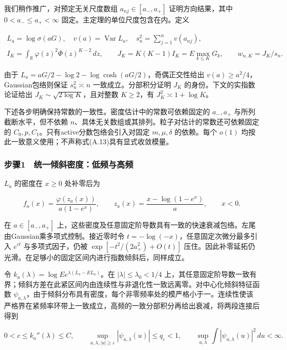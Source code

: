 \documentclass[11pt,a4paper]{article}
\begin{document}
我们稍作推广，对预定无关尺度数组 \(a_{nj}\in[a_-,a_+]\)
证明方向结果，其中 \(0<a_-\le a_+<\infty\)
固定。主定理的单位尺度包含在内。定义

\[
\begin{gathered}
L_a=\log\sigma(aG),\quad v(a)=\operatorname{Var}L_a,\quad
s_n^2=\sum_{j=1}^nv(a_{nj}),\\
I_K=\int_{\mathbb R}\varphi(z)^2\Phi(z)^{K-2}\,dz,\qquad
J_K=K(K-1)I_K=E\max_{k\le K}G_k,\qquad w_{n,K}=J_K/s_n .
\end{gathered}
\tag{A.6}
\]

由于 \(L_a=aG/2-\log2-\log\cosh(aG/2)\)，奇偶正交性给出
\(v(a)\ge a^2/4\)，Gaussian包络则保证 \(s_n^2\asymp n\)
一致成立。分部积分证明 \(J_K\) 的身份。下文的实指数论证给出
\(J_K\sim\sqrt{2\log K}\)，且对整数 \(K\ge2\)，有
\(J_K^2\asymp1+\log K\)。

下述各步明确保持常数的一致性。密度估计中的常数可依赖固定的 \(a_-,a_+\)
与所列截断水平，但不依赖
\(n\)、具体无关数组或其排列。粒子对估计的常数还可依赖固定的
\(C_0,p,C_1\)。只有active分数包络会引入对固定 \(m,\mu,\delta\)
的依赖。每个 \(o(1)\)
均按此一致意义使用；不声称式(A.13)具有显式收敛模量。

\subsubsection*{步骤1　统一倾斜密度：低频与高频}\label{ux6b65ux9aa41-ux7edfux4e00ux503eux659cux5bc6ux5ea6ux4f4eux9891ux4e0eux9ad8ux9891}

\(L_a\) 的密度在 \(x\ge0\) 处补零后为

\[
f_a(x)=\frac{\varphi(z_a(x))}{a(1-e^x)},\qquad
z_a(x)=\frac{x-\log(1-e^x)}a,\qquad x<0 .
\tag{A.7}
\]

在 \(a\in[a_-,a_+]\)
上，这些密度及任意固定阶导数具有一致的快速衰减包络。左尾由Gaussian乘多项式控制。接近零时令
\(t=-\log(-x)\)，任意固定次微分最多引入 \(e^{ct}\) 与多项式因子，仍被
\(\exp[-t^2/(2a_+^2)+O(t)]\)
压住。因此补零延拓仍光滑。在足够小的固定区间内进行指数倾斜后，同样成立。

令 \(k_a(\lambda)=\log E e^{\lambda(L_a-EL_a)}\)。在
\(|\lambda|\le\lambda_0<1/4\)
上，其任意固定阶导数一致有界；倾斜方差在此紧区间内由连续性与非退化性一致远离零。对中心化倾斜特征函数
\(\psi_{a,\lambda}\)，由于倾斜分布具有密度，每个非零频率处的模严格小于一。连续性使该严格界在紧频率环带上一致成立，高频的一致分部积分再给出衰减，将两段连接后得到

\[
0<c\le k_a''(\lambda)\le C,\qquad
\sup_{a,\lambda,|u|\ge\varepsilon}|\psi_{a,\lambda}(u)|\le q_\varepsilon<1,
\qquad
\sup_{a,\lambda}\int|\psi_{a,\lambda}(u)|^2\,du<\infty .
\tag{A.8}
\]
\end{document}
